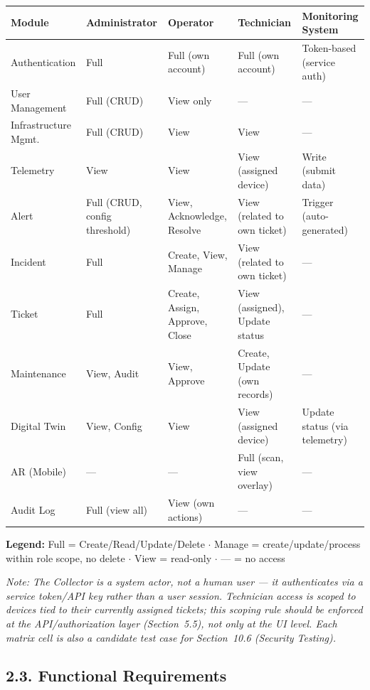 \documentclass[12pt]{article}
\begin{document}
\begin{longtable}{L{2.6cm} L{2.6cm} L{2.9cm} L{2.9cm} L{2.6cm}}
\toprule
\textbf{Module} & \textbf{Administrator} & \textbf{Operator} & \textbf{Technician} & \textbf{Monitoring System} \\
\midrule
\endhead
Authentication & Full & Full (own account) & Full (own account) & Token-based (service auth) \\[4pt]
User Management & Full (CRUD) & View only & --- & --- \\[4pt]
Infrastructure Mgmt. & Full (CRUD) & View & View & --- \\[4pt]
Telemetry & View & View & View (assigned device) & Write (submit data) \\[4pt]
Alert & Full (CRUD, config threshold) & View, Acknowledge, Resolve & View (related to own ticket) & Trigger (auto-generated) \\[4pt]
Incident & Full & Create, View, Manage & View (related to own ticket) & --- \\[4pt]
Ticket & Full & Create, Assign, Approve, Close & View (assigned), Update status & --- \\[4pt]
Maintenance & View, Audit & View, Approve & Create, Update (own records) & --- \\[4pt]
Digital Twin & View, Config & View & View (assigned device) & Update status (via telemetry) \\[4pt]
AR (Mobile) & --- & --- & Full (scan, view overlay) & --- \\[4pt]
Audit Log & Full (view all) & View (own actions) & --- & --- \\
\bottomrule
\end{longtable}

\textbf{Legend:} Full = Create/Read/Update/Delete \quad $\cdot$ \quad Manage = create/update/process within role scope, no delete \quad $\cdot$ \quad View = read-only \quad $\cdot$ \quad --- = no access

\textit{Note: The Collector is a system actor, not a human user --- it authenticates via a service token/API key rather than a user session. Technician access is scoped to devices tied to their currently assigned tickets; this scoping rule should be enforced at the API/authorization layer (Section~5.5), not only at the UI level. Each matrix cell is also a candidate test case for Section~10.6 (Security Testing).}

\subsection*{2.3. Functional Requirements}
\end{document}
